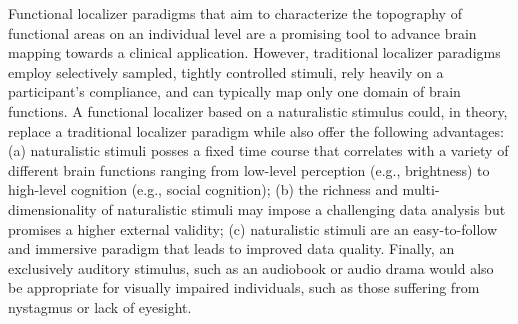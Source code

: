 Functional localizer paradigms that aim to characterize the topography of
functional areas on an individual level are a promising tool to advance brain
mapping towards a clinical application.
However, traditional localizer paradigms employ selectively sampled, tightly
controlled stimuli, rely heavily on a participant's compliance, and can
typically map only one domain of brain functions.
A functional localizer based on a naturalistic stimulus could, in theory,
replace a traditional localizer paradigm while also offer the following
advantages:
(a) naturalistic stimuli posses a fixed time course that correlates with a
variety of different brain functions ranging from low-level perception (e.g.,
brightness) to high-level cognition (e.g., social cognition);
(b) the richness and multi-dimensionality of naturalistic stimuli may impose a
challenging data analysis but promises a higher external validity;
(c) naturalistic stimuli are an easy-to-follow and immersive paradigm that leads
to improved data quality.
Finally, an exclusively auditory stimulus, such as an audiobook or audio drama
would also be appropriate for visually impaired individuals, such as those
suffering from nystagmus or lack of eyesight.

